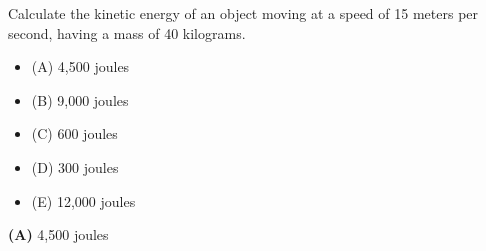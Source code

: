 

Calculate the kinetic energy of an object moving at a speed of 15 meters per second, having a mass of 40 kilograms.

\begin{itemize}
\item{(A)} 4,500 joules
\vskip 5pt 
\item{(B)} 9,000 joules
\vskip 5pt 
\item{(C)} 600 joules
\vskip 5pt 
\item{(D)} 300 joules
\vskip 5pt 
\item{(E)} 12,000 joules
\end{itemize}







{\bf (A)} 4,500 joules
 










